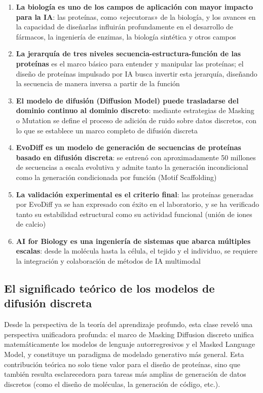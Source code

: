 \documentclass[a4paper]{article}
\begin{document}
\begin{enumerate}
    \item \textbf{La biología es uno de los campos de aplicación con mayor impacto para la IA}: las proteínas, como «ejecutoras» de la biología, y los avances en la capacidad de diseñarlas influirán profundamente en el desarrollo de fármacos, la ingeniería de enzimas, la biología sintética y otros campos

    \item \textbf{La jerarquía de tres niveles secuencia-estructura-función de las proteínas} es el marco básico para entender y manipular las proteínas; el diseño de proteínas impulsado por IA busca invertir esta jerarquía, diseñando la secuencia de manera inversa a partir de la función

    \item \textbf{El modelo de difusión (Diffusion Model) puede trasladarse del dominio continuo al dominio discreto}: mediante estrategias de Masking o Mutation se define el proceso de adición de ruido sobre datos discretos, con lo que se establece un marco completo de difusión discreta

    \item \textbf{EvoDiff es un modelo de generación de secuencias de proteínas basado en difusión discreta}: se entrenó con aproximadamente 50 millones de secuencias a escala evolutiva y admite tanto la generación incondicional como la generación condicionada por función (Motif Scaffolding)

    \item \textbf{La validación experimental es el criterio final}: las proteínas generadas por EvoDiff ya se han expresado con éxito en el laboratorio, y se ha verificado tanto su estabilidad estructural como su actividad funcional (unión de iones de calcio)

    \item \textbf{AI for Biology es una ingeniería de sistemas que abarca múltiples escalas}: desde la molécula hasta la célula, el tejido y el individuo, se requiere la integración y colaboración de métodos de IA multimodal
\end{enumerate}

\subsection{El significado teórico de los modelos de difusión discreta}

Desde la perspectiva de la teoría del aprendizaje profundo, esta clase reveló una perspectiva unificadora profunda: el marco de Masking Diffusion discreto unifica matemáticamente los modelos de lenguaje autorregresivos y el Masked Language Model, y constituye un paradigma de modelado generativo más general. Esta contribución teórica no solo tiene valor para el diseño de proteínas, sino que también resulta esclarecedora para tareas más amplias de generación de datos discretos (como el diseño de moléculas, la generación de código, etc.).
\end{document}
